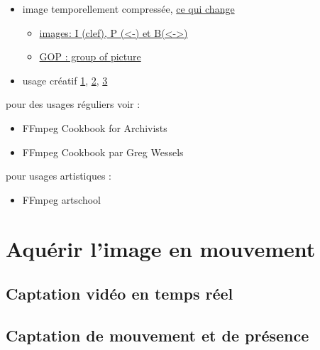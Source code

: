 \documentclass[
]{book}
\providecommand{\tightlist}{%
  \setlength{\itemsep}{0pt}\setlength{\parskip}{0pt}}
\begin{document}
\begin{itemize}
\tightlist
\item
  image temporellement compressée, \href{http://dvd-hq.info/data_compression_3.php}{ce qui change}

  \begin{itemize}
  \tightlist
  \item
    \href{https://en.wikipedia.org/wiki/Video_compression_picture_types}{images: I (clef), P (\textless-) et B(\textless-\textgreater)}
  \item
    \href{https://en.wikipedia.org/wiki/Inter_frame\#/media/File:IPB_images_sequence.png}{GOP : group of picture}
  \end{itemize}
\item
  usage créatif \href{https://www.youtube.com/watch?v=rMSsw4CZvKg}{1}, \href{https://www.youtube.com/watch?v=rSmEOk5AiN0}{2}, \href{https://www.youtube.com/watch?v=dNa0-xrKi3Q}{3}
\end{itemize}

pour des usages réguliers voir :

\begin{itemize}
\tightlist
\item
  FFmpeg Cookbook for Archivists \citep{kromer_FFmpegCookbookArchivists_2020}
\item
  FFmpeg Cookbook par Greg Wessels \citep{wessels_FFmpegCookbook_2017}
\end{itemize}

pour usages artistiques :

\begin{itemize}
\tightlist
\item
  FFmpeg artschool \citep{associationofmovingimagearchivists_FFmpegArtschool_2020}
\end{itemize}

\hypertarget{aquerir}{%
\chapter{Aquérir l'image en mouvement}\label{aquerir}}

\hypertarget{aquerir_captation}{%
\section{Captation vidéo en temps réel}\label{aquerir_captation}}

\hypertarget{captation-de-mouvement-et-de-pruxe9sence}{%
\section{Captation de mouvement et de présence}\label{captation-de-mouvement-et-de-pruxe9sence}}
\end{document}

